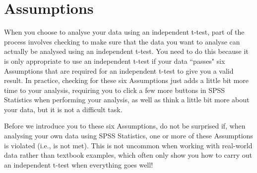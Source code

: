 \documentclass[]{article}
\begin{document}
\section{Assumptions}
When you choose to analyse your data using an independent t-test, part of the process involves checking to make sure that the data you want to analyse can actually be analysed using an independent t-test. You need to do this because it is only appropriate to use an independent t-test if your data ``passes" six Assumptions that are required for an independent t-test to give you a valid result. In practice, checking for these six Assumptions just adds a little bit more time to your analysis, requiring you to click a few more buttons in SPSS Statistics when performing your analysis, as well as think a little bit more about your data, but it is not a difficult task.

Before we introduce you to these six Assumptions, do not be surprised if, when analysing your own data using SPSS Statistics, one or more of these Assumptions is violated (i.e., is not met). This is not uncommon when working with real-world data rather than textbook examples, which often only show you how to carry out an independent t-test when everything goes well! 
\end{document}
